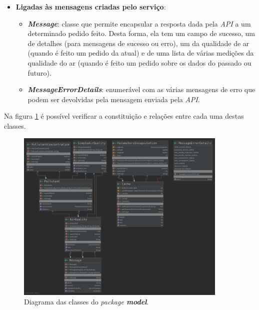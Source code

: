 \begin{itemize}
\begin{itemize}
      \end{itemize}
   \item \textbf{Ligadas às mensagens criadas pelo serviço}:
      \begin{itemize}
         \item \textbf{\textit{Message}}: classe que permite encapsular a resposta dada pela \textit{API} a um determinado pedido feito. Desta forma, ela tem um campo de sucesso, um de detalhes (para mensagens de sucesso ou erro), um da qualidade de ar (quando é feito um pedido da atual) e de uma lista de várias medições da qualidade do ar (quando é feito um pedido sobre os dados do passado ou futuro).
         \item \textbf{\textit{MessageErrorDetails}}: enumerável com as várias mensagens de erro que podem ser devolvidas pela mensagem enviada pela \textit{API}.
      \end{itemize}
\end{itemize}

Na figura \ref{fig:model_diagram} é possível verificar a constituição e relações entre cada uma destas classes.

\begin{figure}[h]
   \centering
   \includegraphics[width=0.90\textwidth]{images/model_diagram}
   \caption{Diagrama das classes do \textit{package \textbf{model}}.}
   \label{fig:model_diagram}
\end{figure}


